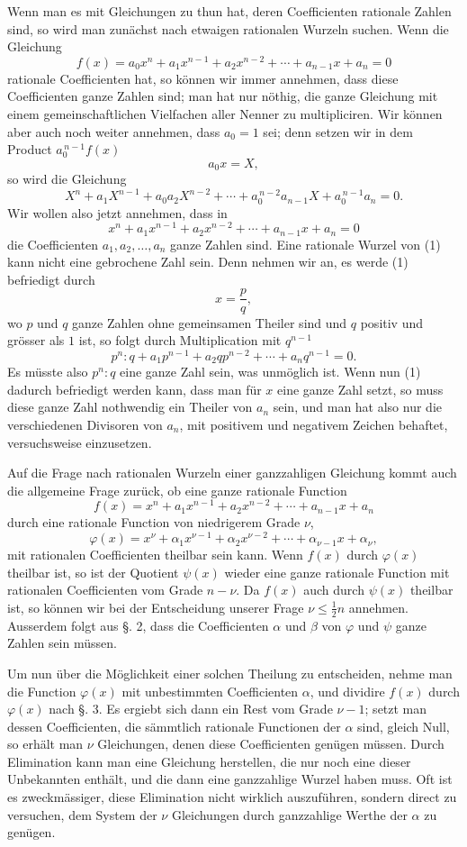 \documentclass[11pt]{article}
\begin{document}
Wenn man es mit Gleichungen zu thun hat, deren Coefficienten rationale Zahlen sind, so wird man zunächst nach etwaigen rationalen Wurzeln suchen. Wenn die Gleichung
\[
        f(x)=a_0x^n+a_1x^{n-1}+a_2x^{n-2}+\cdots+a_{n-1}x+a_n=0
\]
rationale Coefficienten hat, so können wir immer annehmen, dass diese Coefficienten ganze Zahlen sind; man hat nur nöthig, die ganze Gleichung mit einem gemeinschaftlichen Vielfachen aller Nenner zu multipliciren. Wir können aber auch noch weiter annehmen, dass $a_0=1$ sei; denn setzen wir in dem Product $a_0^{\,n-1}f(x)$
\[
        a_0x=X,
\]
so wird die Gleichung
\[
        X^n+a_1X^{n-1}+a_0a_2X^{n-2}+\cdots+a_0^{\,n-2}a_{n-1}X+a_0^{\,n-1}a_n=0.
\]
Wir wollen also jetzt annehmen, dass in
\[
\tag{1}        x^n+a_1x^{n-1}+a_2x^{n-2}+\cdots+a_{n-1}x+a_n=0
\]
die Coefficienten $a_1,a_2,\ldots,a_n$ ganze Zahlen sind. Eine rationale Wurzel von (1) kann nicht eine gebrochene Zahl sein. Denn nehmen wir an, es werde (1) befriedigt durch
\[
        x=\frac pq,
\]
wo $p$ und $q$ ganze Zahlen ohne gemeinsamen Theiler sind und $q$ positiv und grösser als $1$ ist, so folgt durch Multiplication mit $q^{n-1}$
\[
        p^n:q+a_1p^{n-1}+a_2qp^{n-2}+\cdots+a_nq^{n-1}=0.
\]
Es müsste also $p^n:q$ eine ganze Zahl sein, was unmöglich ist. Wenn nun (1) dadurch befriedigt werden kann, dass man für $x$ eine ganze Zahl setzt, so muss diese ganze Zahl nothwendig ein Theiler von $a_n$ sein, und man hat also nur die verschiedenen Divisoren von $a_n$, mit positivem und negativem Zeichen behaftet, versuchsweise einzusetzen.

Auf die Frage nach rationalen Wurzeln einer ganzzahligen Gleichung kommt auch die allgemeine Frage zurück, ob eine ganze rationale Function
\[
        f(x)=x^n+a_1x^{n-1}+a_2x^{n-2}+\cdots+a_{n-1}x+a_n
\]
durch eine rationale Function von niedrigerem Grade $\nu$,
\[
        \varphi(x)=x^\nu+\alpha_1x^{\nu-1}+\alpha_2x^{\nu-2}+\cdots+\alpha_{\nu-1}x+\alpha_\nu,
\]
mit rationalen Coefficienten theilbar sein kann. Wenn $f(x)$ durch $\varphi(x)$ theilbar ist, so ist der Quotient $\psi(x)$ wieder eine ganze rationale Function mit rationalen Coefficienten vom Grade $n-\nu$. Da $f(x)$ auch durch $\psi(x)$ theilbar ist, so können wir bei der Entscheidung unserer Frage $\nu\le \frac12n$ annehmen. Ausserdem folgt aus §. 2, dass die Coefficienten $\alpha$ und $\beta$ von $\varphi$ und $\psi$ ganze Zahlen sein müssen.

Um nun über die Möglichkeit einer solchen Theilung zu entscheiden, nehme man die Function $\varphi(x)$ mit unbestimmten Coefficienten $\alpha$, und dividire $f(x)$ durch $\varphi(x)$ nach §. 3. Es ergiebt sich dann ein Rest vom Grade $\nu-1$; setzt man dessen Coefficienten, die sämmtlich rationale Functionen der $\alpha$ sind, gleich Null, so erhält man $\nu$ Gleichungen, denen diese Coefficienten genügen müssen. Durch Elimination kann man eine Gleichung herstellen, die nur noch eine dieser Unbekannten enthält, und die dann eine ganzzahlige Wurzel haben muss. Oft ist es zweckmässiger, diese Elimination nicht wirklich auszuführen, sondern direct zu versuchen, dem System der $\nu$ Gleichungen durch ganzzahlige Werthe der $\alpha$ zu genügen.
\end{document}
